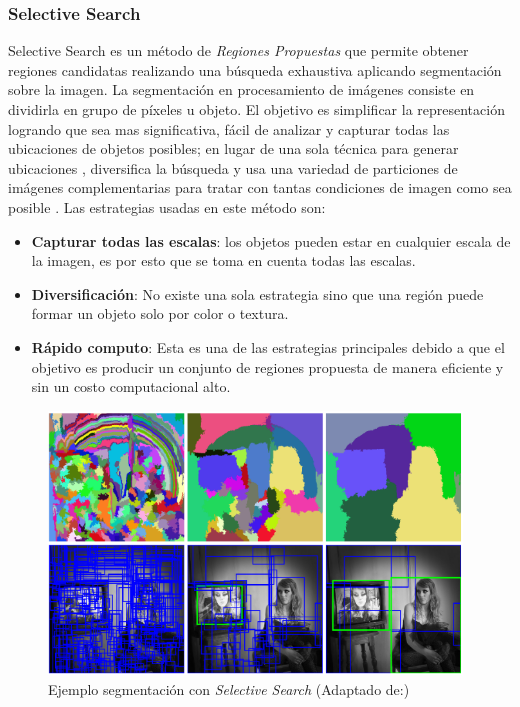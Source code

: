 \subsubsection{Selective Search} \label{sub:selectivesearch}
Selective Search es un método de \textit{Regiones Propuestas} que  permite obtener regiones candidatas realizando una búsqueda exhaustiva aplicando segmentación sobre la imagen. La segmentación  en procesamiento de imágenes consiste en dividirla en grupo de píxeles u objeto. El objetivo es simplificar la representación logrando que sea mas significativa, fácil de analizar y capturar todas las ubicaciones de objetos posibles; en lugar de una sola técnica para generar ubicaciones , diversifica la  búsqueda y usa  una variedad de particiones de imágenes complementarias para tratar con tantas condiciones de imagen como sea posible \citep{selectivesearch}.
Las estrategias usadas en este método son:
\begin{itemize}
\item \textbf{Capturar todas las escalas}: los objetos pueden estar en cualquier escala de la imagen, es por esto que se toma en cuenta todas las escalas.
\item \textbf{Diversificación}: No existe una sola estrategia sino que una región puede formar un objeto solo por color o textura.
\item \textbf{Rápido computo}: Esta es una de las estrategias principales debido a que el objetivo es producir un conjunto de regiones propuesta de manera eficiente y sin un costo computacional alto.
\end{itemize}

\begin{figure}[h]
 \centering
  \includegraphics[height=7cm,keepaspectratio=true,clip=true]{imagenes/Logos/selectivesearch.png}
  \caption{Ejemplo segmentación con \textit{Selective Search} (Adaptado de:\citep{selectivesearch})}
	\label{Fig: overlapping}
\end{figure}


